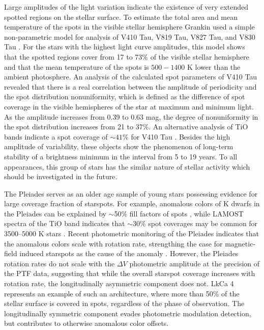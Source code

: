 \documentclass[twocolumn]{emulateapj}%
\begin{document}
Large amplitudes of the light variation indicate the existence of very extended spotted regions on the stellar surface. To estimate the total area and mean temperature of the spots in the visible stellar hemisphere Grankin used a simple non-parametric model for analysis of V410 Tau, V819 Tau, V827 Tau, and V830 Tau \citep{grankin98,grankin99}.  For the stars with the highest light curve amplitudes, this model shows that the spotted regions cover from 17 to 73\% of the visible stellar hemisphere and that the mean temperature of the spots is $500-1400$ K lower than the ambient photosphere.  An analysis of the calculated spot parameters of V410 Tau revealed that there is a real correlation between the amplitude of periodicity and the spot distribution
nonuniformity, which is defined as the difference of spot coverage in the visible hemispheres of the star at maximum and minimum light. As the amplitude increases from 0.39 to 0.63 mag, the degree of nonuniformity in the spot distribution increases from 21 to 37\%.  An alternative analysis of TiO bands indicate a spot coverage of $\sim 41$\% for V410 Tau \citep{petrov94}.  Besides the high amplitude of variability, these objects show the phenomenon of long-term stability of a brightness minimum in the interval from 5 to 19 years.  To all appearances, this group of stars has the similar nature of stellar activity which should be investigated in the future.  





The Pleiades serves as an older age sample of young stars possessing evidence for large coverage fraction of starspots.  For example, anomalous colors of K dwarfs in the Pleiades can be explained by $\sim$50\% fill factors of spots \citep{stauffer03}, while LAMOST spectra of the TiO band indicates that $\sim 30$\% spot coverages may be common for 3500--5000 K stars \citep{fang2016}.  Recent photometric monitoring of the Pleiades indicates that the anomalous colors scale with rotation rate, strengthing the case for magnetic-field induced starspots as the cause of the anomaly \citep{covey16}.  However, the \citet{covey16} Pleiades rotation rates do not scale with the $\Delta V$ photometric amplitude at the precision of the PTF data, suggesting that while the overall starspot coverage increases with rotation rate, the longitudinally asymmetric component does not.  LkCa 4 represents an example of such an architecture, where more than 50\% of the stellar surface is covered in spots, regardless of the phase of observation.  The longitudinally symmetric component evades photometric modulation detection, but contributes to otherwise anomalous color offsets.
\end{document}

